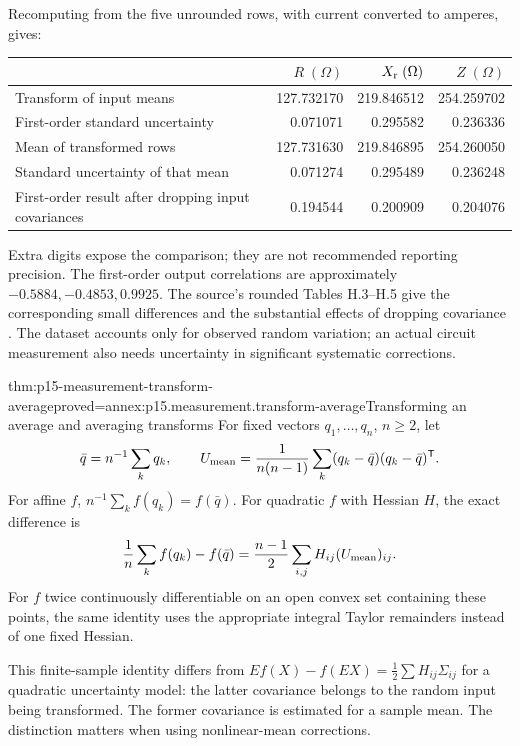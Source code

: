 Recomputing from the five unrounded rows, with current converted to amperes,
gives:
\begin{center}
\begin{tabularx}{\linewidth}{@{}Xrrr@{}}
\toprule
 & \(R\;(\Omega)\)&\(X_{\rm r}\;(\Omega)\)&\(Z\;(\Omega)\)\\
\midrule
Transform of input means &127.732170&219.846512&254.259702\\
First-order standard uncertainty &0.071071&0.295582&0.236336\\
Mean of transformed rows &127.731630&219.846895&254.260050\\
Standard uncertainty of that mean &0.071274&0.295489&0.236248\\
First-order result after dropping input covariances &0.194544&0.200909&0.204076\\
\bottomrule
\end{tabularx}
\end{center}
Extra digits expose the comparison; they are not recommended reporting
precision. The first-order output correlations are approximately
\(-0.5884,-0.4853,0.9925\).
The source's rounded Tables H.3--H.5 give the corresponding small differences
and the substantial effects of dropping covariance
\cite[H.2.3--H.2.4]{JCGM1002008EMeasurement}.
The dataset accounts only for observed random variation; an actual circuit
measurement also needs uncertainty in significant systematic corrections.

\begin{hbtheorem}{thm:p15-measurement-transform-average}{proved=annex:p15.measurement.transform-average}{Transforming an average and averaging transforms}
For fixed vectors \(q_1,\ldots,q_n\), \(n\geq2\), let
\[
 \bar q=n^{-1}\sum_kq_k,\qquad
 U_{\rm mean}=\frac1{n(n-1)}
       \sum_k(q_k-\bar q)(q_k-\bar q)^{\mathsf T}.
\]
For affine \(f\), \(n^{-1}\sum_k f(q_k)=f(\bar q)\).
For quadratic \(f\) with Hessian \(H\), the exact difference is
\[
 \frac1n\sum_kf(q_k)-f(\bar q)
       =\frac{n-1}{2}\sum_{i,j}H_{ij}(U_{\rm mean})_{ij}.
\]
For \(f\) twice continuously differentiable on an open convex set containing
these points, the same identity uses the
appropriate integral Taylor remainders instead of one fixed Hessian.
\end{hbtheorem}

This finite-sample identity differs from
\(Ef(X)-f(EX)=\tfrac12\sum H_{ij}\Sigma_{ij}\) for a quadratic uncertainty
model: the latter covariance belongs to the random input being transformed.
The former covariance is estimated for a sample mean. The distinction matters
when using nonlinear-mean corrections.

